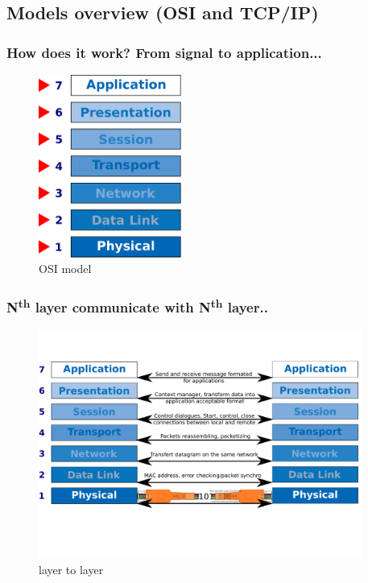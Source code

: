 \subsection{Models overview (OSI and TCP/IP)}
  \begin{frame}
    \frametitle{How does it work? From signal to application...}
    \begin{figure}[t]
      \centering
      \includegraphics[height=6cm]{./imgs/osi_model.eps}
      \caption{OSI model}
      \label{fig:osi_mod}
    \end{figure}
  \end{frame}
  \begin{frame}
    \frametitle{N\textsuperscript{th} layer communicate with N\textsuperscript{th} layer..}
    \begin{figure}[t]
      \centering
      \includegraphics[height=7.5cm]{./imgs/layer2layer.pdf}
      \caption{layer to layer}
      \label{fig:layer2layer}
    \end{figure}
  \end{frame}

